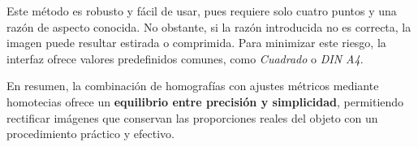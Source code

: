 Este método es robusto y fácil de usar, pues requiere solo cuatro puntos y una razón de aspecto conocida. No obstante, si la razón introducida no es correcta, la imagen puede resultar estirada o comprimida. Para minimizar este riesgo, la interfaz ofrece valores predefinidos comunes, como \textit{Cuadrado} o \textit{DIN A4}.

\vspace{\baselineskip}

En resumen, la combinación de homografías con ajustes métricos mediante homotecias ofrece un \textbf{equilibrio entre precisión y simplicidad}, permitiendo rectificar imágenes que conservan las proporciones reales del objeto con un procedimiento práctico y efectivo.